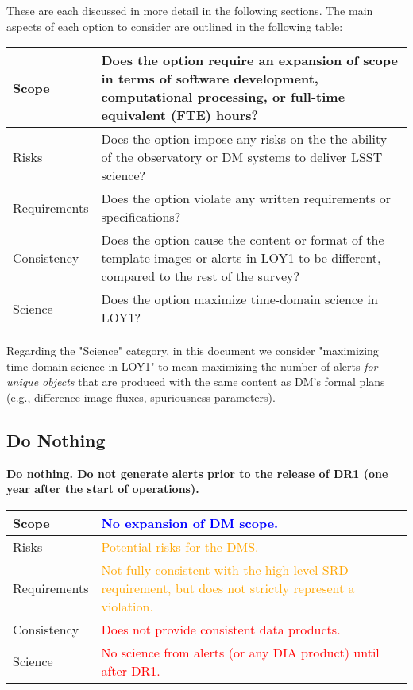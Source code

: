 \documentclass[DM,lsstdraft,toc]{lsstdoc}
\begin{document}
These are each discussed in more detail in the following sections.
The main aspects of each option to consider are outlined in the following table:
\begin{center}
\begin{tabular}{|p{2.5cm}|p{13cm}|}
\hline
Scope & Does the option require an expansion of scope in terms of software development, computational processing, or full-time equivalent (FTE) hours? \\
\hline
Risks & Does the option impose any risks on the the ability of the observatory or DM systems to deliver LSST science?  \\
\hline
Requirements & Does the option violate any written requirements or specifications? \\
\hline
Consistency & Does the option cause the content or format of the template images or alerts in LOY1 to be different, compared to the rest of the survey? \\ 
\hline
Science & Does the option maximize time-domain science in LOY1? \\
\hline
\end{tabular}
\end{center} 

Regarding the "Science" category, in this document we consider "maximizing time-domain science in LOY1" to mean maximizing the number of alerts {\em for unique objects} that are produced with the same content as DM's formal plans (e.g., difference-image fluxes, spuriousness parameters). 

\clearpage
\subsection{Do Nothing}\label{ssec:potsol_donothing}

{\bf Do nothing. Do not generate alerts prior to the release of DR1 (one year after the start of operations).}

\begin{center}
\begin{tabular}{|p{2.5cm}|p{13cm}|}
\hline
Scope & \textcolor{blue}{No expansion of DM scope.} \\
\hline
Risks & \textcolor{orange}{Potential risks for the DMS.} \\
\hline
Requirements & \textcolor{orange}{Not fully consistent with the high-level SRD requirement, but does not strictly represent a violation.} \\
\hline
Consistency & \textcolor{red}{Does not provide consistent data products.} \\
\hline
Science & \textcolor{red}{No science from alerts (or any DIA product) until after DR1.} \\
\hline
\end{tabular}
\end{center}
\end{document}

